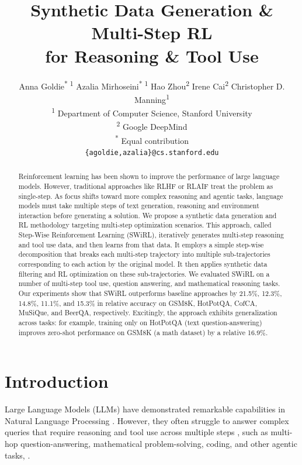 \documentclass{article} %
\title{\centering Synthetic Data Generation \& Multi-Step RL \\ for Reasoning \& Tool Use}
\author{
  Anna Goldie\textsuperscript{* 1}\enskip
  Azalia Mirhoseini\textsuperscript{* 1}\enskip
  Hao Zhou\textsuperscript{2}\enskip
  Irene Cai\textsuperscript{2}\enskip
  Christopher D. Manning\textsuperscript{1} \\ %
  \textsuperscript{1} Department of Computer Science, Stanford University \\ %
  \textsuperscript{2} Google DeepMind \\   %
  \textsuperscript{*} Equal contribution \\
  \texttt{\{agoldie,azalia\}@cs.stanford.edu} %
}
\begin{document}
\maketitle

\begin{abstract}
Reinforcement learning has been shown to improve the performance of large language models. However, traditional approaches like RLHF or RLAIF treat the problem as single-step. As focus shifts toward more complex reasoning and agentic tasks, language models must take multiple steps of text generation, reasoning and environment interaction before generating a solution. We propose a synthetic data generation and RL methodology targeting multi-step optimization scenarios. This approach, called Step-Wise Reinforcement Learning (SWiRL), iteratively generates multi-step reasoning and tool use data, and then learns from that data. It employs a simple step-wise decomposition that breaks each multi-step trajectory into multiple sub-trajectories corresponding to each action by the original model. It then applies synthetic data filtering and RL optimization on these sub-trajectories. We evaluated SWiRL on a number of multi-step tool use, question answering, and mathematical reasoning tasks. Our experiments show that SWiRL outperforms baseline approaches by 21.5\%, 12.3\%, 14.8\%, 11.1\%, and 15.3\% in relative accuracy on GSM8K, HotPotQA, CofCA, MuSiQue, and BeerQA, respectively. Excitingly, the approach exhibits generalization across tasks: for example, training only on HotPotQA (text question-answering) improves zero-shot performance on GSM8K (a math dataset) by a relative 16.9\%.


\end{abstract}
\section{Introduction}
Large Language Models (LLMs) have demonstrated remarkable capabilities in Natural Language Processing  \citep{geminiteam2024gemini15, anthropic2024claude3, openai2024gpt4technicalreport}. However, they often struggle to answer complex queries that require reasoning and tool use across multiple steps \citep{wu2024cofcastepwisecounterfactualmultihop}, such as multi-hop question-answering, mathematical problem-solving, coding, and other agentic tasks, \citep{yang2018hotpotqadatasetdiverseexplainable, trivedi2022musiquemultihopquestionssinglehop,wu2024cofcastepwisecounterfactualmultihop,gsm8k2021,jimenez2024swebenchlanguagemodelsresolve, ehrlich2025codemonkeysscalingtesttimecompute,li2022competition}.
\end{document}
